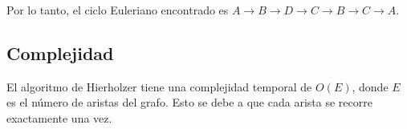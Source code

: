 \documentclass{article}
\begin{document}
Por lo tanto, el ciclo Euleriano encontrado es \( A \to B \to D \to C \to B \to C \to A \).

\subsection{Complejidad}

El algoritmo de Hierholzer tiene una complejidad temporal de \( O(E) \), donde \( E \) es el número de aristas del grafo. Esto se debe a que cada arista se recorre exactamente una vez.

\end{document}
